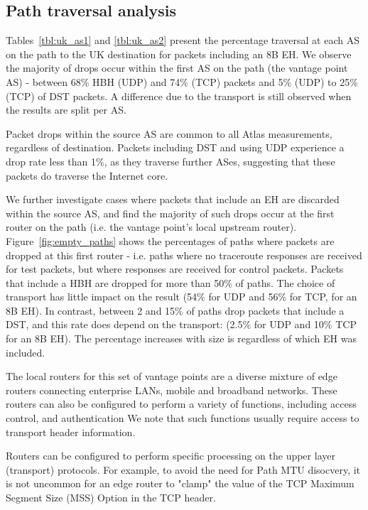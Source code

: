 \documentclass[conference]{IEEEtran}
\begin{document}
\subsection{Path traversal analysis}

Tables~\ref{tbl:uk_as1} and \ref{tbl:uk_as2} present the percentage traversal at each AS on the path to the UK destination for packets including an 8B EH. We observe the majority of drops occur within the first AS on the path (the vantage point AS) - between 68\% HBH (UDP) and 74\% (TCP) packets and 5\% (UDP) to 25\% (TCP) of DST packets. A difference due to the transport is still observed when the results are split per AS. 

Packet drops within the source AS are common to all Atlas measurements, regardless of destination. Packets including DST and using UDP experience a drop rate less than 1\%, as they traverse further  ASes, suggesting that these packets do traverse the Internet core.

We further investigate cases where packets that include an EH are discarded within the source AS, and find the majority of such drops occur at the first router on the path (i.e. the vantage point's local upstream router).
Figure~\ref{fig:empty_paths} shows the percentages of paths where packets are dropped at this first router - i.e. paths where no traceroute responses are received for test packets, but where responses are received for control packets. Packets that include a HBH are dropped for more than 50\% of paths. The choice of transport has little impact on the result (54\% for UDP and 56\% for TCP, for an 8B EH). In contrast, between 2 and 15\% of paths drop packets that include a DST, and this rate does depend on the transport: (2.5\% for UDP and 10\% TCP for an 8B EH). The percentage increases with size  is regardless of which EH was included.


The local routers for this set of vantage points are a diverse mixture of edge routers connecting enterprise LANs, mobile and broadband networks. These routers can also be configured to perform a variety of functions, including access control, and authentication We note that such functions usually require access to transport header information. 

Routers can be configured to perform specific processing on the upper layer (transport) protocols. For example, to avoid the need for Path MTU disocvery, it is not uncommon for an edge router to "clamp" the value of the TCP Maximum Segment Size (MSS) Option in the TCP header. 
\end{document}
